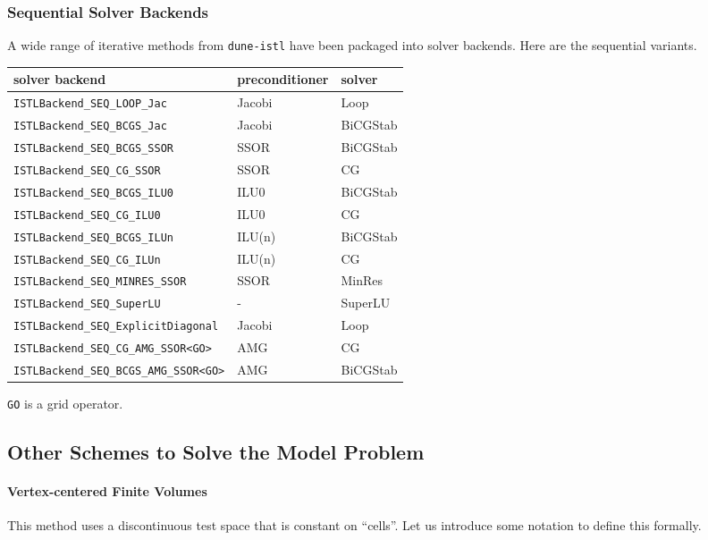 \begin{frame}
  \frametitle{Sequential Solver Backends}
A wide range of iterative methods from \lstinline!dune-istl! have been packaged into
solver backends. Here are the sequential variants.
\begin{center}\small
\begin{tabular}{|l|l|l|}\hline
solver backend & preconditioner & solver\\\hline
\lstinline!ISTLBackend_SEQ_LOOP_Jac! & Jacobi & Loop\\\hline
\lstinline!ISTLBackend_SEQ_BCGS_Jac! & Jacobi & BiCGStab\\\hline
\lstinline!ISTLBackend_SEQ_BCGS_SSOR! & SSOR & BiCGStab\\\hline
\lstinline!ISTLBackend_SEQ_CG_SSOR! & SSOR & CG\\\hline
\lstinline!ISTLBackend_SEQ_BCGS_ILU0! & ILU0 & BiCGStab\\\hline
\lstinline!ISTLBackend_SEQ_CG_ILU0! & ILU0 & CG\\\hline
\lstinline!ISTLBackend_SEQ_BCGS_ILUn! & ILU(n) & BiCGStab\\\hline
\lstinline!ISTLBackend_SEQ_CG_ILUn! & ILU(n) & CG\\\hline
\lstinline!ISTLBackend_SEQ_MINRES_SSOR! & SSOR & MinRes\\\hline
\lstinline!ISTLBackend_SEQ_SuperLU! & - & SuperLU\\\hline
\lstinline!ISTLBackend_SEQ_ExplicitDiagonal! & Jacobi & Loop\\\hline
\lstinline!ISTLBackend_SEQ_CG_AMG_SSOR<GO>! & AMG & CG\\\hline
\lstinline!ISTLBackend_SEQ_BCGS_AMG_SSOR<GO>! & AMG & BiCGStab\\\hline
\end{tabular}
\end{center}
\lstinline!GO! is a grid operator.
\end{frame}


\subsection<article>{Other Schemes to Solve the Model Problem}

\paragraph{Vertex-centered Finite Volumes}

This method uses a discontinuous test space that is constant on
``cells''. Let us introduce some notation to define this formally.

